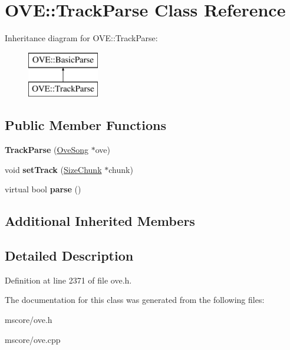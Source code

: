 \hypertarget{class_o_v_e_1_1_track_parse}{}\section{O\+VE\+:\+:Track\+Parse Class Reference}
\label{class_o_v_e_1_1_track_parse}
Inheritance diagram for O\+VE\+:\+:Track\+Parse\+:\begin{figure}[H]
\begin{center}
\leavevmode
\includegraphics[height=2.000000cm]{class_o_v_e_1_1_track_parse}
\end{center}
\end{figure}
\subsection*{Public Member Functions}
\begin{DoxyCompactItemize}
\item 
\mbox{\label{class_o_v_e_1_1_track_parse_af9359ceaefa6b0bf532d585179f68e6b}} 
{\bfseries Track\+Parse} (\hyperlink{class_o_v_e_1_1_ove_song}{Ove\+Song} $\ast$ove)
\item 
\mbox{\label{class_o_v_e_1_1_track_parse_ac7aeba04f71b2ffa65121bf5c5b3c3ec}} 
void {\bfseries set\+Track} (\hyperlink{class_o_v_e_1_1_size_chunk}{Size\+Chunk} $\ast$chunk)
\item 
\mbox{\label{class_o_v_e_1_1_track_parse_a1b802cd452dd6292310c0861f552caa3}} 
virtual bool {\bfseries parse} ()
\end{DoxyCompactItemize}
\subsection*{Additional Inherited Members}


\subsection{Detailed Description}


Definition at line 2371 of file ove.\+h.



The documentation for this class was generated from the following files\+:\begin{DoxyCompactItemize}
\item 
mscore/ove.\+h\item 
mscore/ove.\+cpp\end{DoxyCompactItemize}
